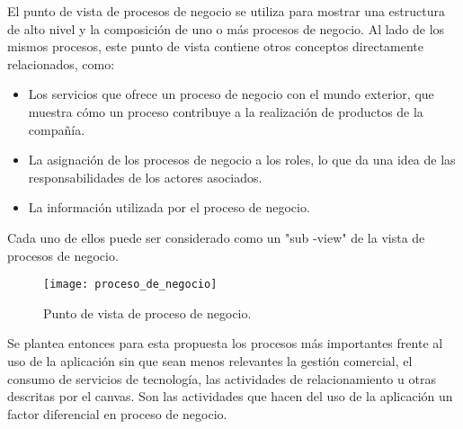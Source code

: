 El punto de vista de procesos de negocio se utiliza para mostrar una estructura de alto nivel y la composición de uno o más procesos de negocio. Al lado de los mismos procesos, este punto de vista contiene otros conceptos directamente relacionados, como:

\begin{itemize}
        \item Los servicios que ofrece un proceso de negocio con el mundo exterior, que muestra cómo un proceso contribuye a la realización de productos de la compañía.
        \item La asignación de los procesos de negocio a los roles, lo que da una idea de las responsabilidades de los actores asociados.
        \item La información utilizada por el proceso de negocio. 
\end{itemize}
Cada uno de ellos puede ser considerado como un "sub -view" de la vista de procesos de negocio.

\begin{figure}[H]
\centering
\texttt{[image: proceso\_de\_negocio]}
\caption{Punto de vista de proceso de negocio.}
\end{figure}

Se plantea entonces para esta propuesta los procesos más importantes frente al uso de la aplicación sin que sean menos relevantes la gestión comercial, el consumo de servicios de tecnología, las actividades de relacionamiento u otras descritas por el canvas. Son las actividades que hacen del uso de la aplicación un factor diferencial en proceso de negocio.

